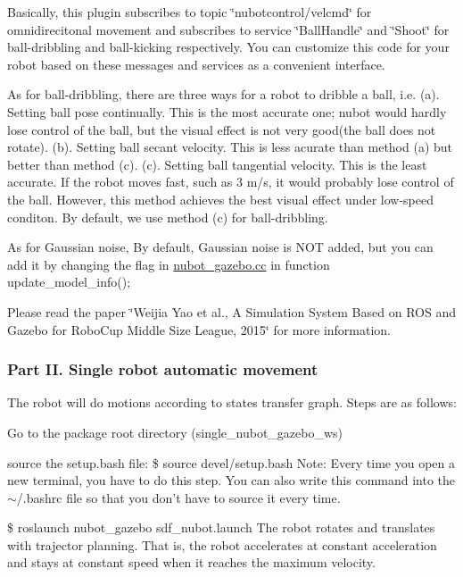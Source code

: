Basically, this plugin subscribes to topic \char`\"{}nubotcontrol/velcmd\char`\"{} for omnidirecitonal movement and subscribes to service \char`\"{}\-Ball\-Handle\char`\"{} and \char`\"{}\-Shoot\char`\"{} for ball-\/dribbling and ball-\/kicking respectively. You can customize this code for your robot based on these messages and services as a convenient interface.

As for ball-\/dribbling, there are three ways for a robot to dribble a ball, i.\-e. (a). Setting ball pose continually. This is the most accurate one; nubot would hardly lose control of the ball, but the visual effect is not very good(the ball does not rotate). (b). Setting ball secant velocity. This is less acurate than method (a) but better than method (c). (c). Setting ball tangential velocity. This is the least accurate. If the robot moves fast, such as 3 m/s, it would probably lose control of the ball. However, this method achieves the best visual effect under low-\/speed conditon. By default, we use method (c) for ball-\/dribbling.

As for Gaussian noise, By default, Gaussian noise is N\-O\-T added, but you can add it by changing the flag in \hyperlink{nubot__gazebo_8cc}{nubot\-\_\-gazebo.\-cc} in function update\-\_\-model\-\_\-info();

Please read the paper \char`\"{}\-Weijia Yao et al., A Simulation System Based on R\-O\-S and Gazebo for Robo\-Cup Middle Size League, 2015\char`\"{} for more information.

\subsubsection*{Part I\-I. Single robot automatic movement}

The robot will do motions according to states transfer graph. Steps are as follows\-:
\begin{DoxyEnumerate}
\item Go to the package root directory (single\-\_\-nubot\-\_\-gazebo\-\_\-ws)
\item source the setup.\-bash file\-: \$ source devel/setup.\-bash Note\-: Every time you open a new terminal, you have to do this step. You can also write this command into the $\sim$/.bashrc file so that you don't have to source it every time.
\item \$ roslaunch nubot\-\_\-gazebo sdf\-\_\-nubot.\-launch The robot rotates and translates with trajector planning. That is, the robot accelerates at constant acceleration and stays at constant speed when it reaches the maximum velocity.
\end{DoxyEnumerate}

